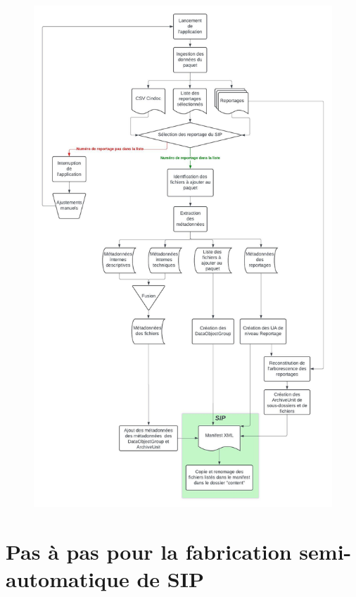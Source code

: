 \documentclass[a4paper,12pt,twoside]{book}
\begin{document}
\begin{figure}[h]
	\centering
	\includegraphics[height=\textheight]{./img/schema_orphee.jpeg}
	\label{fig:schema}
\end{figure}

\chapter[Annexe 2]{Pas à pas pour la fabrication semi-automatique de SIP}
\label{sec:annexe2}


\newpage{\pagestyle{empty}\cleardoublepage}


\backmatter 
\printglossaries
\listoftables
\listoffigures
\tableofcontents
\end{document}
